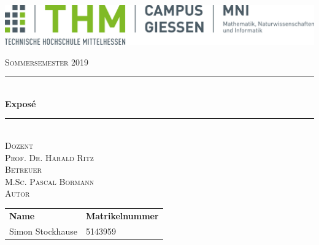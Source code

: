\documentclass[a4paper]{article}
\begin{document}
\begin{titlepage} %
	\newcommand{\HRule}{\rule{\linewidth}{0.5mm}} %
	
	\centering %
	
	\includegraphics[width=\textwidth, height=0.7\textheight]{img/LOGO_MNI.png}
	\vfill
	
	\textsc{\Large Sommersemester 2019}\\[0.5cm]
	
	
	
	
	\HRule\\[0.4cm]
	
	{\huge\bfseries Exposé }\\[0.4cm] %
	
	\HRule\\[1.5cm]
	\textsc{\Large Dozent}\\[0.5cm]
	\textsc{ Prof. Dr. Harald Ritz}\\[0.5cm] %
	\textsc{\Large Betreuer}\\[0.5cm]
	\textsc{ M.Sc. Pascal Bormann}\\[0.5cm] %
	\vspace{1.5cm}
	\textsc{\Large Autor}\\[0.8cm]
	
	\begin{tabular}{ll}
		\textbf{Name} & \textbf{Matrikelnummer}\\[0.5cm]
		Simon Stockhause & 5143959\\[0.5cm]
	\end{tabular}

	
	
	
	

\end{titlepage}
\end{document}
